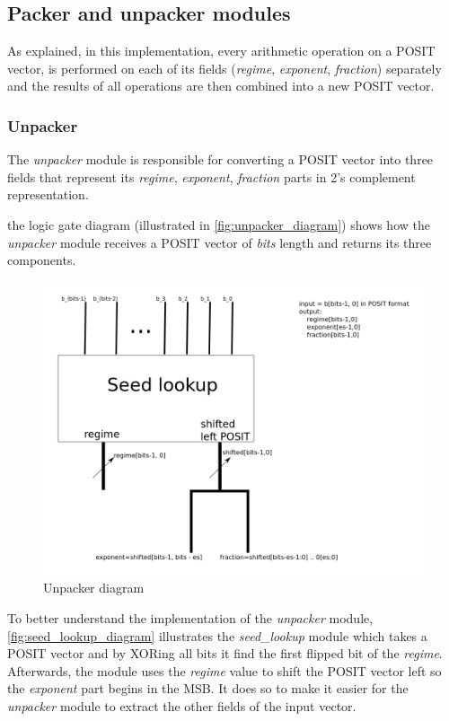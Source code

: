 \documentclass[10pt]{article}
\begin{document}
\subsection{Packer and unpacker modules}\label{sec:pack-unpack-modul}

As explained, in this implementation, every arithmetic operation on a POSIT
vector, is performed on each of its fields (\textit{regime}, \textit{exponent},
\textit{fraction}) separately and the results of all operations are then
combined into a new POSIT vector.

\subsubsection{Unpacker}\label{sec:unpacker}

The \textit{unpacker} module is responsible for converting a POSIT vector into
three fields that represent its \textit{regime}, \textit{exponent},
\textit{fraction} parts in 2's complement representation.

the logic gate diagram (illustrated in \autoref{fig:unpacker_diagram})
shows how the \textit{unpacker} module receives a POSIT vector of \textit{bits}
length and returns its three components.

\begin{figure}[h]
  \centering
  \includegraphics[width=\textwidth, height=0.2\paperheight]{unpacker_diagram}
  \caption{Unpacker diagram}
  \label{fig:unpacker_diagram}
\end{figure}

To better understand the implementation of the \textit{unpacker} module,
\autoref{fig:seed_lookup_diagram} illustrates the \textit{seed\_lookup} module
which takes a POSIT vector and by XORing all bits it find the first flipped bit
of the \textit{regime}.
Afterwards, the module uses the  \textit{regime} value to shift the POSIT vector left
so the \textit{exponent} part begins in the MSB. It does so to make it easier
for the \textit{unpacker} module to extract the other fields of the input vector.
\end{document}
